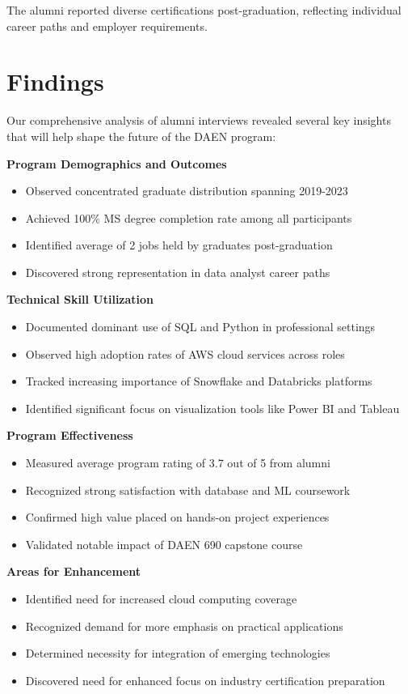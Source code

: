 \documentclass[12pt,a4paper]{article}
\begin{document}
The alumni reported diverse certifications post-graduation, reflecting individual career paths and employer requirements. 

\newpage

\section{Findings}
Our comprehensive analysis of alumni interviews revealed several key insights that will help shape the future of the DAEN program:

\noindent\textbf{Program Demographics and Outcomes}
\begin{itemize}
\item Observed concentrated graduate distribution spanning 2019-2023
\item Achieved 100\% MS degree completion rate among all participants
\item Identified average of 2 jobs held by graduates post-graduation
\item Discovered strong representation in data analyst career paths
\end{itemize}
\textbf{Technical Skill Utilization}
\begin{itemize}
\item Documented dominant use of SQL and Python in professional settings
\item Observed high adoption rates of AWS cloud services across roles
\item Tracked increasing importance of Snowflake and Databricks platforms
\item Identified significant focus on visualization tools like Power BI and Tableau
\end{itemize}
\textbf{Program Effectiveness}
\begin{itemize}
\item Measured average program rating of 3.7 out of 5 from alumni
\item Recognized strong satisfaction with database and ML coursework
\item Confirmed high value placed on hands-on project experiences
\item Validated notable impact of DAEN 690 capstone course
\end{itemize}
\textbf{Areas for Enhancement}
\begin{itemize}
\item Identified need for increased cloud computing coverage
\item Recognized demand for more emphasis on practical applications
\item Determined necessity for integration of emerging technologies
\item Discovered need for enhanced focus on industry certification preparation
\end{itemize}
\end{document}
